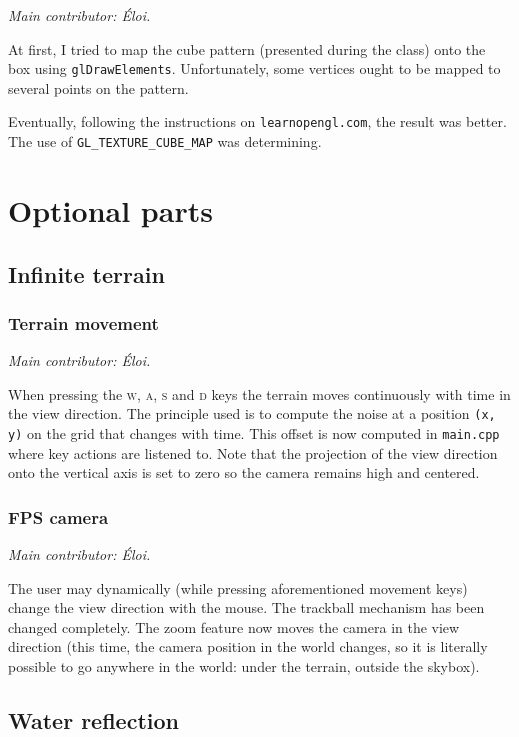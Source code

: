 \documentclass[12pt]{article}
\begin{document}
{\it Main contributor: Éloi.}

At first, I tried to map the cube pattern (presented during the class) onto the box using \texttt{glDrawElements}. Unfortunately, some vertices ought to be mapped to several points on the pattern.

Eventually, following the instructions on \texttt{learnopengl.com}, the result was better. The use of \texttt{\textsc{GL\_TEXTURE\_CUBE\_MAP}} was determining.


\section{Optional parts}

\subsection{Infinite terrain}

\subsubsection{Terrain movement}

{\it Main contributor: Éloi.}

When pressing the \textsc{w, a, s} and \textsc{d} keys the terrain moves continuously with time in the view direction. The principle used is to compute the noise at a position \texttt{(x, y)} on the grid that changes with time. This offset is now computed in \texttt{main.cpp} where key actions are listened to. Note that the projection of the view direction onto the vertical axis is set to zero so the camera remains high and centered.


\subsubsection{FPS camera}

{\it Main contributor: Éloi.}

The user may dynamically (while pressing aforementioned movement keys) change the view direction with the mouse. The trackball mechanism has been changed completely. The zoom feature now moves the camera in the view direction (this time, the camera position in the world changes, so it is literally possible to go anywhere in the world: under the terrain, outside the skybox).


\subsection{Water reflection}
\end{document}
